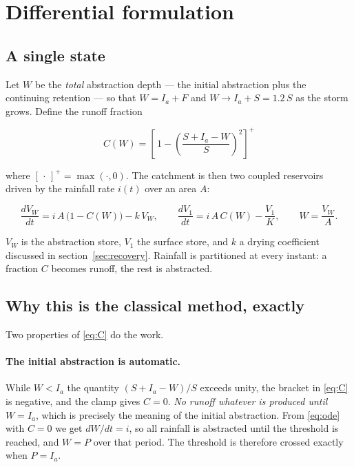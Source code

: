 \documentclass[11pt,a4paper]{article}
\begin{document}
\section{Differential formulation}

\subsection{A single state}

Let $W$ be the \emph{total} abstraction depth --- the initial abstraction plus
the continuing retention --- so that $W=I_a+F$ and $W\to I_a+S=1.2\,S$ as the
storm grows. Define the runoff fraction

\begin{equation}
\boxed{\;C(W)=\left[\,1-\left(\frac{S+I_a-W}{S}\right)^{2}\right]^{+}\;}
\label{eq:C}
\end{equation}

\noindent
where $[\,\cdot\,]^{+}=\max(\cdot,0)$. The catchment is then two coupled
reservoirs driven by the rainfall rate $i(t)$ over an area $A$:

\begin{equation}
\frac{dV_W}{dt}=i\,A\,\bigl(1-C(W)\bigr)-k\,V_W,
\qquad
\frac{dV_1}{dt}=i\,A\,C(W)-\frac{V_1}{K},
\qquad W=\frac{V_W}{A}.
\label{eq:ode}
\end{equation}

\noindent
$V_W$ is the abstraction store, $V_1$ the surface store, and $k$ a drying
coefficient discussed in section~\ref{sec:recovery}. Rainfall is partitioned at
every instant: a fraction $C$ becomes runoff, the rest is abstracted.

\subsection{Why this is the classical method, exactly}

Two properties of \eqref{eq:C} do the work.

\paragraph{The initial abstraction is automatic.}
While $W<I_a$ the quantity $(S+I_a-W)/S$ exceeds unity, the bracket in
\eqref{eq:C} is negative, and the clamp gives $C=0$. \emph{No runoff whatever is
produced until $W=I_a$}, which is precisely the meaning of the initial
abstraction. From \eqref{eq:ode} with $C=0$ we get $dW/dt=i$, so all rainfall is
abstracted until the threshold is reached, and $W=P$ over that period. The
threshold is therefore crossed exactly when $P=I_a$.
\end{document}
